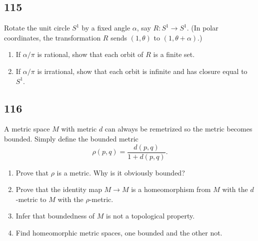 \documentclass{amsart}
\begin{document}
\subsection*{115}
Rotate the unit circle $S^1$ by a fixed angle $\alpha$, say $R : S^1 \to S^1$. (In polar coordinates, the transformation $R$ sends $(1,\theta)$ to $(1,\theta+\alpha)$.)
\begin{enumerate}[label=(\alph*)]
\item If $\alpha/\pi$ is rational, show that each orbit of $R$ is a finite set.
\item[*(b)] If $\alpha/\pi$ is irrational, show that each orbit is infinite and has closure equal to $S^1$.
\end{enumerate}

\subsection*{116}
A metric space $M$ with metric $d$ can always be remetrized so the metric becomes bounded. Simply define the bounded metric
\[
\rho(p,q) = \frac{d(p,q)}{1+d(p,q)}.
\]
\begin{enumerate}[label=(\alph*)]
\item Prove that $\rho$ is a metric. Why is it obviously bounded?
\item Prove that the identity map $M \to M$ is a homeomorphism from $M$ with the $d$-metric to $M$ with the $\rho$-metric.
\item Infer that boundedness of $M$ is not a topological property.
\item Find homeomorphic metric spaces, one bounded and the other not.
\end{enumerate}
\end{document}
